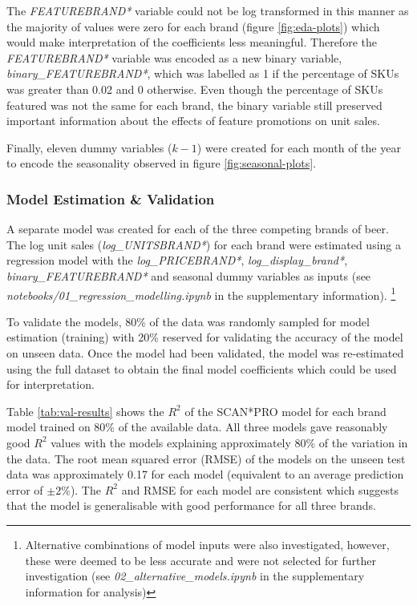 \documentclass[a4paper,11pt]{article}
\begin{document}
The \textit{FEATUREBRAND*} variable could not be log transformed in this manner as the majority of values were zero for each brand (figure \ref{fig:eda-plots}) which would make interpretation of the coefficients less meaningful. Therefore the \textit{FEATUREBRAND*} variable was encoded as a new binary variable, \textit{binary\_FEATUREBRAND*}, which was labelled as 1 if the percentage of SKUs was greater than 0.02 and 0 otherwise. Even though the percentage of SKUs featured was not the same for each brand, the binary variable still preserved important information about the effects of feature promotions on unit sales.

Finally, eleven dummy variables ($k-1$) were created for each month of the year to encode the seasonality observed in figure \ref{fig:seasonal-plots}.


\subsubsection{Model Estimation \& Validation}
A separate model was created for each of the three competing brands of beer. The log unit sales (\textit{log\_UNITSBRAND*}) for each brand were estimated using a regression model with the \textit{log\_PRICEBRAND*}, \textit{log\_display\_brand*}, \textit{binary\_FEATUREBRAND*} and seasonal dummy variables as inputs (see \textit{notebooks/01\_regression\_modelling.ipynb} in the supplementary information). \footnote{Alternative combinations of model inputs were also investigated, however, these were deemed to be less accurate and were not selected for further investigation (see \textit{02\_alternative\_models.ipynb} in the supplementary information for analysis)}

To validate the models, 80\% of the data was randomly sampled for model estimation (training) with 20\% reserved for validating the accuracy of the model on unseen data. Once the model had been validated, the model was re-estimated using the full dataset to obtain the final model coefficients which could be used for interpretation.

Table \ref{tab:val-results} shows the $R^2$ of the SCAN*PRO model for each brand model trained on 80\% of the available data. All three models gave reasonably good $R^2$ values with the models explaining approximately 80\% of the variation in the data. The root mean squared error (RMSE) of the models on the unseen test data was approximately 0.17 for each model (equivalent to an average prediction error of $\pm 2\%$). The $R^2$ and RMSE for each model are consistent which suggests that the model is generalisable with good performance for all three brands.
\end{document}

